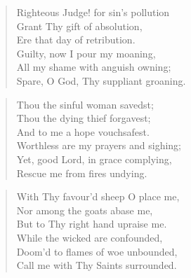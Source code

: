 \begin{quote}

\smallskip
Righteous Judge! for sin's pollution\\
Grant Thy gift of absolution,\\
Ere that day of retribution.\\
Guilty, now I pour my moaning,\\
All my shame with anguish owning;\\
Spare, O God, Thy suppliant groaning.
\end{quote}

\begin{quote}

\smallskip
Thou the sinful woman savedst;\\
Thou the dying thief forgavest;\\
And to me a hope vouchsafest.\\
Worthless are my prayers and sighing;\\
Yet, good Lord, in grace complying,\\
Rescue me from fires undying.
\end{quote}

\begin{quote}

\smallskip
With Thy favour'd sheep O place me,\\
Nor among the goats abase me,\\
But to Thy right hand upraise me.\\
While the wicked are confounded,\\
Doom'd to flames of woe unbounded,\\
Call me with Thy Saints surrounded.
\end{quote}

